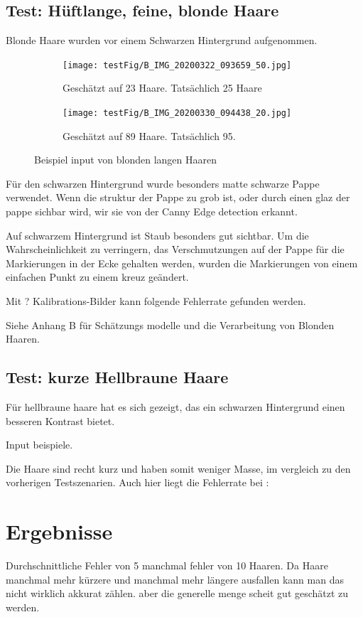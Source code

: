 \documentclass[german,a4paper, 12pt]{scrartcl}
\begin{document}
\subsection{Test: Hüftlange, feine, blonde Haare}

Blonde Haare wurden vor einem Schwarzen Hintergrund aufgenommen. 

\begin{figure}
	\centering
	\begin{subfigure}[b]{0.475\textwidth}
		\centering
		\texttt{[image: testFig/B\_IMG\_20200322\_093659\_50.jpg]}
		\caption[]{Geschätzt auf 23 Haare. Tatsächlich 25 Haare}
		\label{img:tstM1} 
	\end{subfigure}
	\hfill
	\begin{subfigure}[b]{0.475\textwidth} 
		\centering
		\texttt{[image: testFig/B\_IMG\_20200330\_094438\_20.jpg]}
		\caption[]{Geschätzt auf 89 Haare. Tatsächlich 95.}
		\label{img:tstM2}
	\end{subfigure}
	\caption[  ]
	{\small Beispiel input von blonden langen Haaren} 
	\label{img:tstM}
\end{figure}
Für den schwarzen Hintergrund wurde besonders matte schwarze Pappe verwendet. Wenn die struktur der Pappe zu grob ist, oder durch einen glaz der pappe sichbar wird, wir sie von der Canny Edge detection erkannt. 

Auf schwarzem Hintergrund ist Staub besonders gut sichtbar. Um die Wahrscheinlichkeit zu verringern, das Verschmutzungen auf der Pappe für die Markierungen in der Ecke gehalten werden, wurden die Markierungen von einem einfachen Punkt zu einem kreuz geändert.  

Mit ? Kalibrations-Bilder kann folgende Fehlerrate gefunden werden.

Siehe Anhang B für Schätzungs modelle und die Verarbeitung von Blonden Haaren.

\subsection{Test: kurze Hellbraune Haare}

Für hellbraune haare hat es sich gezeigt, das ein schwarzen Hintergrund einen besseren Kontrast bietet.

Input beispiele.

Die Haare sind recht kurz und haben somit weniger Masse, im vergleich zu den vorherigen Testszenarien. Auch hier liegt die Fehlerrate bei :  


\section{Ergebnisse}
Durchschnittliche Fehler von 5 manchmal fehler von 10 Haaren. 
Da Haare manchmal mehr kürzere und manchmal mehr längere ausfallen kann man das nicht wirklich akkurat zählen. aber die generelle menge scheit gut geschätzt zu werden. 
\end{document}
